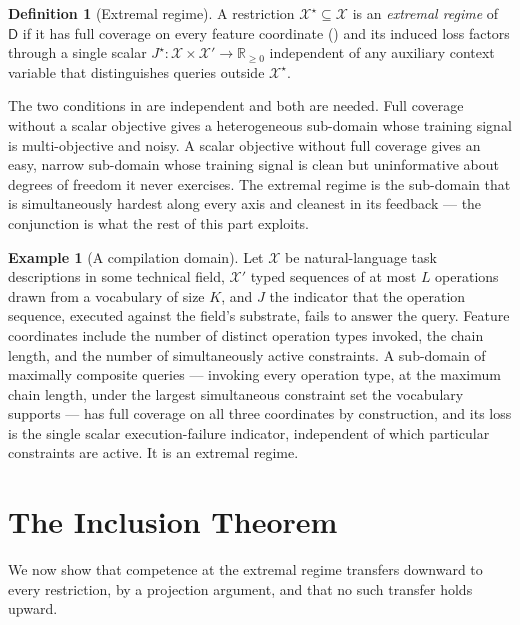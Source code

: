 \documentclass[11pt,twocolumn,a4paper]{article}
\theoremstyle{rdm}
\theoremstyle{definition}
\newtheorem{definition}[theorem]{Definition}
\newtheorem{example}[theorem]{Example}
\theoremstyle{remark}
\newcommand{\R}{\mathbb{R}}
\newcommand{\Cands}{\mathcal{X}}
\newcommand{\Dom}{\mathsf{D}}
\begin{document}
\begin{definition}[Extremal regime]
\label{def:extremal}
A restriction $\Cands^\star \subseteq \Cands$ is an \emph{extremal regime} of
$\Dom$ if it has full coverage on every feature coordinate
() and its induced loss factors through a single scalar
$J^\star: \Cands \times \Cands' \to \R_{\ge0}$ independent of any auxiliary
context variable that distinguishes queries outside $\Cands^\star$.
\end{definition}

The two conditions in  are independent and both are
needed. Full coverage without a scalar objective gives a heterogeneous
sub-domain whose training signal is multi-objective and noisy. A scalar
objective without full coverage gives an easy, narrow sub-domain whose
training signal is clean but uninformative about degrees of freedom it never
exercises. The extremal regime is the sub-domain that is simultaneously
hardest along every axis and cleanest in its feedback --- the conjunction is
what the rest of this part exploits.

\begin{example}[A compilation domain]
\label{ex:compilation}
Let $\Cands$ be natural-language task descriptions in some technical field,
$\Cands'$ typed sequences of at most $L$ operations drawn from a vocabulary
of size $K$, and $J$ the indicator that the operation sequence, executed
against the field's substrate, fails to answer the query. Feature
coordinates include the number of distinct operation types invoked, the
chain length, and the number of simultaneously active constraints. A
sub-domain of maximally composite queries --- invoking every operation type,
at the maximum chain length, under the largest simultaneous constraint set
the vocabulary supports --- has full coverage on all three coordinates by
construction, and its loss is the single scalar execution-failure indicator,
independent of which particular constraints are active. It is an extremal
regime.
\end{example}

\section{The Inclusion Theorem}
\label{sec:inclusion}

We now show that competence at the extremal regime transfers downward to
every restriction, by a projection argument, and that no such transfer holds
upward.
\end{document}
